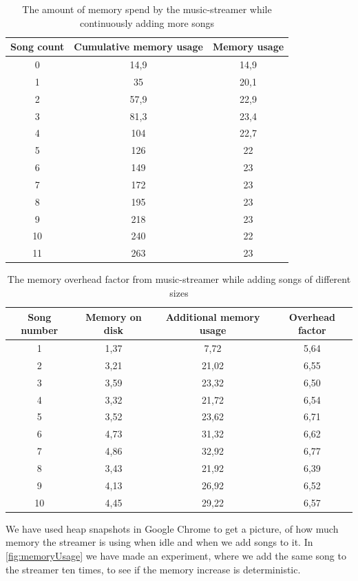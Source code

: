 \begin{table}[]
\centering
\begin{tabular}{|c|c|c|} \hline
Song count & Cumulative memory usage & Memory usage \\ \hline
0  & 14,9 & 14,9 \\
1  & 35   & 20,1 \\
2  & 57,9 & 22,9 \\
3  & 81,3 & 23,4 \\
4  & 104  & 22,7 \\
5  & 126  & 22   \\
6  & 149  & 23   \\
7  & 172  & 23   \\
8  & 195  & 23   \\
9  & 218  & 23   \\
10 & 240  & 22   \\
11 & 263  & 23   \\ \hline
\end{tabular}
\caption{The amount of memory spend by the music-streamer while continuously adding more songs}
\label{tab:memoryUsage}
\end{table}

\begin{table}[]
\centering
\begin{tabular}{|c|c|c|c|} \hline
Song number & Memory on disk & Additional memory usage & Overhead factor \\ \hline
1  & 1,37 & 7,72  & 5,64 \\
2  & 3,21 & 21,02 & 6,55 \\
3  & 3,59 & 23,32 & 6,50 \\
4  & 3,32 & 21,72 & 6,54 \\
5  & 3,52 & 23,62 & 6,71 \\
6  & 4,73 & 31,32 & 6,62 \\
7  & 4,86 & 32,92 & 6,77 \\
8  & 3,43 & 21,92 & 6,39 \\
9  & 4,13 & 26,92 & 6,52 \\
10 & 4,45 & 29,22 & 6,57 \\ \hline
\end{tabular}
\caption{The memory overhead factor from music-streamer while adding songs of different sizes}
\label{tab:memoryDiffSizes}
\end{table}		
\noindent
We have used heap snapshots in Google Chrome to get a picture,
of how much memory the streamer is using when idle and when we add songs to it. 
In \ref{fig:memoryUsage} we have made an experiment,
where we add the same song to the streamer ten times,
to see if the memory increase is deterministic.

